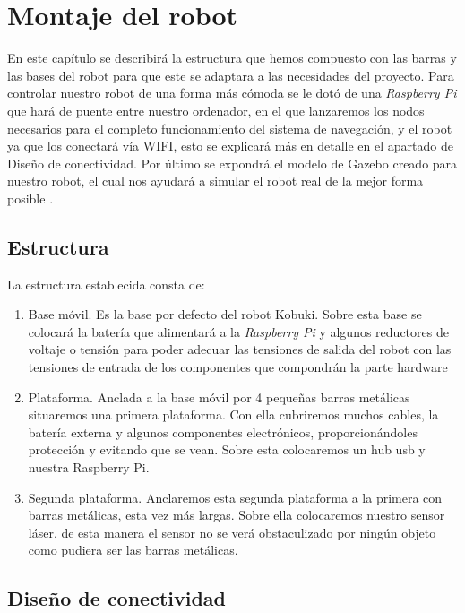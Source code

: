 \chapter{Montaje del robot}
\label{cap:montajedelrobot}
En este capítulo se describirá la estructura que hemos compuesto con las barras y las bases del robot para que este se adaptara a las necesidades del proyecto. Para controlar nuestro robot de una forma más cómoda se le dotó de una \textit{Raspberry Pi} que hará de puente entre nuestro ordenador, en el que lanzaremos los nodos necesarios para el completo funcionamiento del sistema de navegación, y el robot ya que los conectará vía WIFI, esto se explicará más en detalle en el apartado de Diseño de conectividad. Por último se expondrá el modelo de Gazebo creado para nuestro robot, el cual nos ayudará a simular el robot real de la mejor forma posible .

\section{Estructura}
\label{cap:estructuradelrobot}
La estructura establecida consta de:
\begin{enumerate}
\item Base móvil. Es la base por defecto del robot Kobuki. Sobre esta base se colocará la batería que alimentará a la \textit{Raspberry Pi} y algunos reductores de voltaje o tensión para poder adecuar las tensiones de salida del robot con las tensiones de entrada de los componentes que compondrán la parte hardware
\item Plataforma. Anclada a la base móvil por 4 pequeñas barras metálicas situaremos una primera plataforma. Con ella cubriremos muchos cables, la batería externa y algunos componentes electrónicos, proporcionándoles protección y evitando que se vean. Sobre esta colocaremos un hub usb y nuestra Raspberry Pi. 
\item Segunda plataforma. Anclaremos esta segunda plataforma a la primera con barras metálicas, esta vez más largas. Sobre ella colocaremos nuestro sensor láser, de esta manera el sensor no se verá obstaculizado por ningún objeto como pudiera ser las barras metálicas.
\end{enumerate}

\section{Diseño de conectividad}
\label{cap:conectividad}




